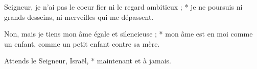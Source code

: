 \item Seigneur, je n'ai pas le coeur fier ni le regard ambitieux ; * je ne poursuis ni grands desseins, ni merveilles qui me dépassent.

\item Non, mais je tiens mon âme égale et silencieuse ; * mon âme est en moi comme un enfant, comme un petit enfant contre sa mère.

\item Attends le Seigneur, Israël, * maintenant et à jamais.